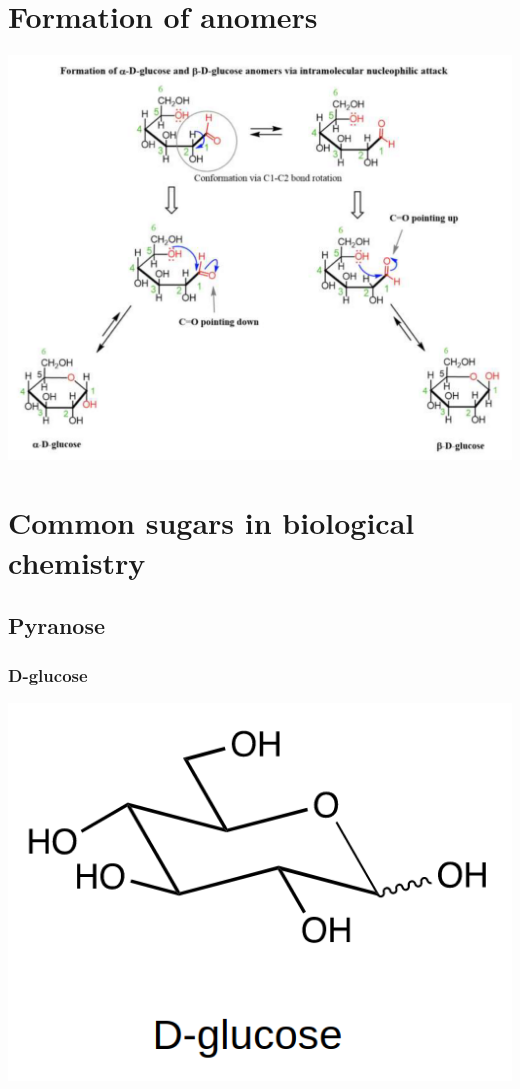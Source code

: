 \documentclass[11pt]{article}
\begin{document}
\section{Formation of anomers}
\label{sec:org8c11f30}
\begin{center}
\includegraphics[width=.9\linewidth]{./images/formation-of-anomers.png}
\end{center}


\section{Common sugars in biological chemistry}
\label{sec:org23bb122}

\subsection{Pyranose}
\label{sec:org5441e89}

\subsubsection{D-glucose}
\label{sec:org3175960}

\begin{center}
\includegraphics[scale=1.0]{./images/d-glucose.png}
\end{center}
\end{document}
